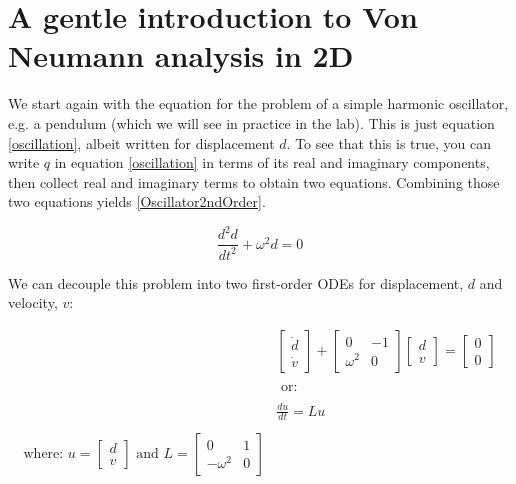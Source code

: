 \section{A gentle introduction to Von Neumann analysis in 2D}

We start again with the equation for the problem of a simple harmonic oscillator, e.g. a pendulum (which we will see in practice in the lab). This is just equation \ref{oscillation}, albeit written for displacement $d$. To see that this is true, you can write $q$ in equation \ref{oscillation} in terms of its real and imaginary components, then collect real and imaginary terms to obtain two equations. Combining those two equations yields \ref{Oscillator2ndOrder}.

\begin{equation}
	\frac{d^2 d}{d t^2}+\omega^2 d=0
	\label{Oscillator2ndOrder}
\end{equation}

We can decouple this problem into two first-order ODEs for displacement, $d$ and velocity, $v$:

\begin{equation}
	\begin{aligned}
		& {\left[\begin{array}{l}
				\dot{d} \\
				\dot{v}
			\end{array}\right]+\left[\begin{array}{ll}
				0 & -1 \\
				\omega^2 & 0
			\end{array}\right]\left[\begin{array}{l}
				d \\
				v
			\end{array}\right]=\left[\begin{array}{l}
				0 \\
				0
			\end{array}\right]} \\
		\\
		& \text {     or:    } \\
		\\
		& \frac{du}{dt}=L u \\
		\\
		\text{where:      } u=\left[\begin{array}{l}
			d \\
			v
		\end{array}\right]   \text{     and         } L=\left[\begin{array}{cc}
			0 & 1 \\
			-\omega^2 & 0
		\end{array}\right]
	\end{aligned}
	\label{OscillatorDecoupled}
\end{equation}

